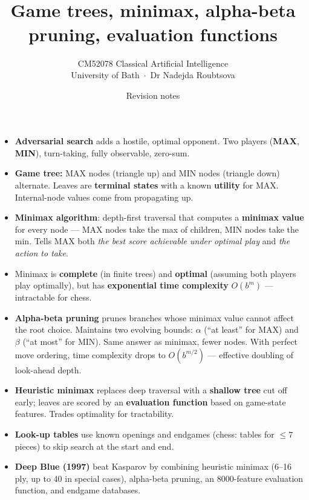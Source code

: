 \documentclass[11pt, a4paper]{article}
\title{\vspace{-1cm}{\Huge\bfseries Week 5 — Adversarial Search} \\[0.4em]{\large Game trees, minimax, alpha-beta pruning, evaluation functions}}
\author{\large CM52078 Classical Artificial Intelligence \\[0.2em]\normalsize University of Bath \,$\cdot$\, Dr Nadejda Roubtsova}
\date{Revision notes}
\begin{document}
\maketitle
\thispagestyle{empty}

\vspace{1em}

\begin{tldrbox}
\begin{itemize}[leftmargin=*]
  \item \textbf{Adversarial search} adds a hostile, optimal opponent. Two players (\textbf{MAX}, \textbf{MIN}), turn-taking, fully observable, zero-sum.
  \item \textbf{Game tree:} MAX nodes (triangle up) and MIN nodes (triangle down) alternate. Leaves are \textbf{terminal states} with a known \textbf{utility} for MAX. Internal-node values come from propagating up.
  \item \textbf{Minimax algorithm}: depth-first traversal that computes a \textbf{minimax value} for every node — MAX nodes take the max of children, MIN nodes take the min. Tells MAX both \emph{the best score achievable under optimal play} and \emph{the action to take}.
  \item Minimax is \textbf{complete} (in finite trees) and \textbf{optimal} (assuming both players play optimally), but has \textbf{exponential time complexity} $O(b^m)$ — intractable for chess.
  \item \textbf{Alpha-beta pruning} prunes branches whose minimax value cannot affect the root choice. Maintains two evolving bounds: $\alpha$ (``at least'' for MAX) and $\beta$ (``at most'' for MIN). Same answer as minimax, fewer nodes. With perfect move ordering, time complexity drops to $O(b^{m/2})$ — effective doubling of look-ahead depth.
  \item \textbf{Heuristic minimax} replaces deep traversal with a \textbf{shallow tree} cut off early; leaves are scored by an \textbf{evaluation function} based on game-state features. Trades optimality for tractability.
  \item \textbf{Look-up tables} use known openings and endgames (chess: tables for $\le 7$ pieces) to skip search at the start and end.
  \item \textbf{Deep Blue (1997)} beat Kasparov by combining heuristic minimax (6--16 ply, up to 40 in special cases), alpha-beta pruning, an 8000-feature evaluation function, and endgame databases.
\end{itemize}
\end{tldrbox}
\end{document}
